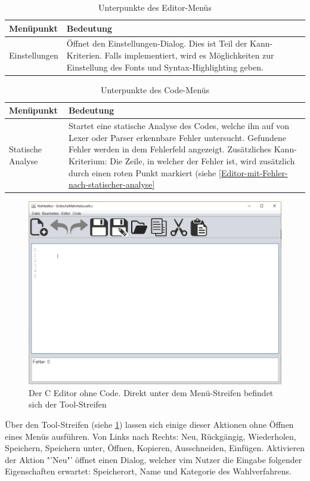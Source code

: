 \documentclass[a4paper]{scrreprt}
\begin{document}
\begin{table}[H]
\begin{tabular}{|p{3cm}|p{12cm}|}
Menüpunkt & Bedeutung \\
\hline
Einstellungen & Öffnet den Einstellungen-Dialog. Dies ist Teil der Kann-Kriterien. Falls implementiert, wird es Möglichkeiten zur Einstellung des Fonts und Syntax-Highlighting geben.
\end{tabular}
\label{Editor-Menüpunkte}
\caption{Unterpunkte des Editor-Menüs}
\end{table}

\begin{table}[H]
\begin{tabular}{|p{3cm}|p{12cm}|}
Menüpunkt & Bedeutung \\
\hline
Statische Analyse & Startet eine statische Analyse des Codes, welche ihn auf von Lexer oder Parser erkennbare Fehler untersucht. Gefundene Fehler werden in dem Fehlerfeld angezeigt. Zusätzliches Kann-Kriterium: Die Zeile, in welcher der Fehler ist, wird zusätzlich durch einen roten Punkt markiert (siehe \ref{Editor-mit-Fehler-nach-statischer-analyse}
\end{tabular}
\label{Editor-Menüpunkte}
\caption{Unterpunkte des Code-Menüs}
\end{table}

\begin{figure}[H]
\includegraphics[scale=0.5]{Editor-ohne-text.png}
\caption{Der C Editor ohne Code. Direkt unter dem Menü-Streifen befindet sich der Tool-Streifen}
\label{C-Editor-Tool-Streifen}
\end{figure}

Über den Tool-Streifen (siehe \ref{C-Editor-Tool-Streifen}) lassen sich einige dieser Aktionen ohne Öffnen eines Menüs ausführen. Von Links nach Rechts: Neu, Rückgängig, Wiederholen, Speichern, Speichern unter, Öffnen, Kopieren, Ausschneiden, Einfügen. Aktivieren der Aktion "'Neu"' öffnet einen Dialog, welcher vim Nutzer die Eingabe folgender Eigenschaften erwartet: Speicherort, Name und Kategorie des Wahlverfahrens.
\end{document}
